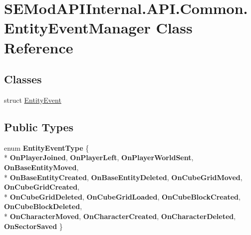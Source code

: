 \hypertarget{class_s_e_mod_a_p_i_internal_1_1_a_p_i_1_1_common_1_1_entity_event_manager}{}\section{S\+E\+Mod\+A\+P\+I\+Internal.\+A\+P\+I.\+Common.\+Entity\+Event\+Manager Class Reference}
\label{class_s_e_mod_a_p_i_internal_1_1_a_p_i_1_1_common_1_1_entity_event_manager}
\subsection*{Classes}
\begin{DoxyCompactItemize}
\item 
struct \hyperlink{struct_s_e_mod_a_p_i_internal_1_1_a_p_i_1_1_common_1_1_entity_event_manager_1_1_entity_event}{Entity\+Event}
\end{DoxyCompactItemize}
\subsection*{Public Types}
\begin{DoxyCompactItemize}
\item 
\hypertarget{class_s_e_mod_a_p_i_internal_1_1_a_p_i_1_1_common_1_1_entity_event_manager_aa65a6a6bb031451b20a68dcd27f5d442}{}enum {\bfseries Entity\+Event\+Type} \{ \\*
{\bfseries On\+Player\+Joined}, 
{\bfseries On\+Player\+Left}, 
{\bfseries On\+Player\+World\+Sent}, 
{\bfseries On\+Base\+Entity\+Moved}, 
\\*
{\bfseries On\+Base\+Entity\+Created}, 
{\bfseries On\+Base\+Entity\+Deleted}, 
{\bfseries On\+Cube\+Grid\+Moved}, 
{\bfseries On\+Cube\+Grid\+Created}, 
\\*
{\bfseries On\+Cube\+Grid\+Deleted}, 
{\bfseries On\+Cube\+Grid\+Loaded}, 
{\bfseries On\+Cube\+Block\+Created}, 
{\bfseries On\+Cube\+Block\+Deleted}, 
\\*
{\bfseries On\+Character\+Moved}, 
{\bfseries On\+Character\+Created}, 
{\bfseries On\+Character\+Deleted}, 
{\bfseries On\+Sector\+Saved}
 \}\label{class_s_e_mod_a_p_i_internal_1_1_a_p_i_1_1_common_1_1_entity_event_manager_aa65a6a6bb031451b20a68dcd27f5d442}

\end{DoxyCompactItemize}
